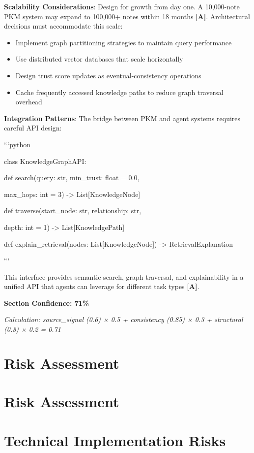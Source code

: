\documentclass[a4paper,11pt]{article}
\newcommand{\alabel}{\textbf{\textcolor{acolor}{[A]}}}
\begin{document}
\textbf{Scalability Considerations}: Design for growth from day one. A 10,000-note PKM system may expand to 100,000+ notes within 18 months \alabel{}. Architectural decisions must accommodate this scale:


\begin{itemize}
  \item Implement graph partitioning strategies to maintain query performance
  \item Use distributed vector databases that scale horizontally
  \item Design trust score updates as eventual-consistency operations
  \item Cache frequently accessed knowledge paths to reduce graph traversal overhead
\end{itemize}

\textbf{Integration Patterns}: The bridge between PKM and agent systems requires careful API design:


```python

class KnowledgeGraphAPI:

def search(query: str, min\_trust: float = 0.0,

max\_hops: int = 3) -> List[KnowledgeNode]


def traverse(start\_node: str, relationship: str,

depth: int = 1) -> List[KnowledgePath]


def explain\_retrieval(nodes: List[KnowledgeNode]) -> RetrievalExplanation

```


This interface provides semantic search, graph traversal, and explainability in a unified API that agents can leverage for different task types \alabel{}.


\textbf{Section Confidence: 71\%}\par
\textit{Calculation: source\_signal (0.6) × 0.5 + consistency (0.85) × 0.3 + structural (0.8) × 0.2 = 0.71}

\clearpage
\section{Risk Assessment}

\section{Risk Assessment}

\section{Technical Implementation Risks}
\end{document}
